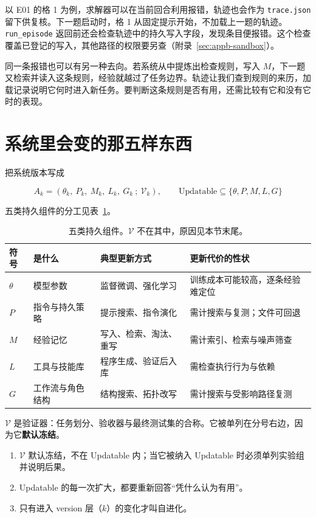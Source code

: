 以 E01 的格 1 为例，求解器可以在当前回合利用报错，轨迹也会作为 \texttt{trace.json} 留下供复核。下一题启动时，格 1 从固定提示开始，不加载上一题的轨迹。
\texttt{run\_episode} 返回前还会检查轨迹中的持久写入字段，发现条目便报错。这个检查覆盖已登记的写入，其他路径的权限要另查（附录~\ref{sec:appb-sandbox}）。

同一条报错也可以有另一种去向。若系统从中提炼出检查规则，写入 $M$，下一题又检索并读入这条规则，经验就越过了任务边界。轨迹让我们查到规则的来历，加载记录说明它何时进入新任务。要判断这条规则是否有用，还需比较有它和没有它时的表现。

\section{系统里会变的那五样东西}
\label{sec:components}

把系统版本写成

\begin{equation}
A_k=(\theta_k,\ P_k,\ M_k,\ L_k,\ G_k\ ;\ \mathcal V_k),
\qquad \text{Updatable}\subseteq\{\theta,P,M,L,G\}
\label{eq:ak}
\end{equation}

五类持久组件的分工见表~\ref{tab:components}。

\begin{table}[htbp]
\centering
\begin{tabular}{@{}p{1.2cm}p{4.4cm}p{4.0cm}p{3.4cm}@{}}
\toprule
符号 & 是什么 & 典型更新方式 & 更新代价的性状 \\
\midrule
$\theta$ & 模型参数 & 监督微调、强化学习 & 训练成本可能较高，逐条经验难定位 \\
$P$ & 指令与持久策略 & 提示搜索、指令演化 & 需计搜索与复测；文件可回退 \\
$M$ & 经验记忆 & 写入、检索、淘汰、重写 & 需计索引、检索与噪声筛查 \\
$L$ & 工具与技能库 & 程序生成、验证后入库 & 需检查执行行为与依赖 \\
$G$ & 工作流与角色结构 & 结构搜索、拓扑改写 & 需计搜索与受影响路径复测 \\
\bottomrule
\end{tabular}
\caption{五类持久组件。$\mathcal V$ 不在其中，原因见本节末尾。}
\label{tab:components}
\end{table}

$\mathcal V$ 是验证器：任务划分、验收器与最终测试集的合称。它被单列在分号右边，因为它\textbf{默认冻结}。

\begin{definition}[三条公理]
\begin{enumerate}
  \item $\mathcal V$ 默认冻结，不在 Updatable 内；当它被纳入 Updatable 时必须单列实验组并说明后果。
  \item Updatable 的每一次扩大，都要重新回答“凭什么认为有用”。
  \item 只有进入 version 层（$k$）的变化才叫自进化。
\end{enumerate}
\end{definition}


